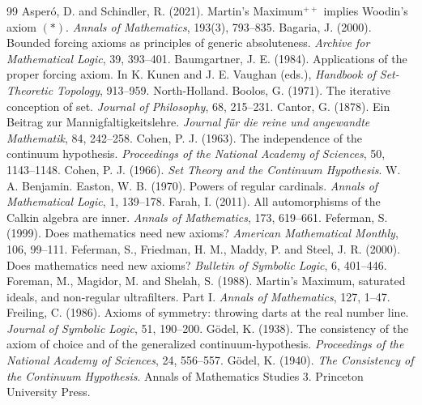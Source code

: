 \documentclass{situationist-preprint}
\begin{document}
\begin{thebibliography}{99}\small
{} Asperó, D. and Schindler, R. (2021). Martin's Maximum$^{++}$ implies Woodin's axiom $(*)$. \emph{Annals of Mathematics}, 193(3), 793--835.
 Bagaria, J. (2000). Bounded forcing axioms as principles of generic absoluteness. \emph{Archive for Mathematical Logic}, 39, 393--401.
 Baumgartner, J. E. (1984). Applications of the proper forcing axiom. In K. Kunen and J. E. Vaughan (eds.), \emph{Handbook of Set-Theoretic Topology}, 913--959. North-Holland.
 Boolos, G. (1971). The iterative conception of set. \emph{Journal of Philosophy}, 68, 215--231.
 Cantor, G. (1878). Ein Beitrag zur Mannigfaltigkeitslehre. \emph{Journal für die reine und angewandte Mathematik}, 84, 242--258.
 Cohen, P. J. (1963). The independence of the continuum hypothesis. \emph{Proceedings of the National Academy of Sciences}, 50, 1143--1148.
 Cohen, P. J. (1966). \emph{Set Theory and the Continuum Hypothesis}. W. A. Benjamin.
 Easton, W. B. (1970). Powers of regular cardinals. \emph{Annals of Mathematical Logic}, 1, 139--178.
 Farah, I. (2011). All automorphisms of the Calkin algebra are inner. \emph{Annals of Mathematics}, 173, 619--661.
 Feferman, S. (1999). Does mathematics need new axioms? \emph{American Mathematical Monthly}, 106, 99--111.
 Feferman, S., Friedman, H. M., Maddy, P. and Steel, J. R. (2000). Does mathematics need new axioms? \emph{Bulletin of Symbolic Logic}, 6, 401--446.
 Foreman, M., Magidor, M. and Shelah, S. (1988). Martin's Maximum, saturated ideals, and non-regular ultrafilters. Part I. \emph{Annals of Mathematics}, 127, 1--47.
 Freiling, C. (1986). Axioms of symmetry: throwing darts at the real number line. \emph{Journal of Symbolic Logic}, 51, 190--200.
 G\"odel, K. (1938). The consistency of the axiom of choice and of the generalized continuum-hypothesis. \emph{Proceedings of the National Academy of Sciences}, 24, 556--557.
 G\"odel, K. (1940). \emph{The Consistency of the Continuum Hypothesis}. Annals of Mathematics Studies 3. Princeton University Press.

\end{thebibliography}
\end{document}
